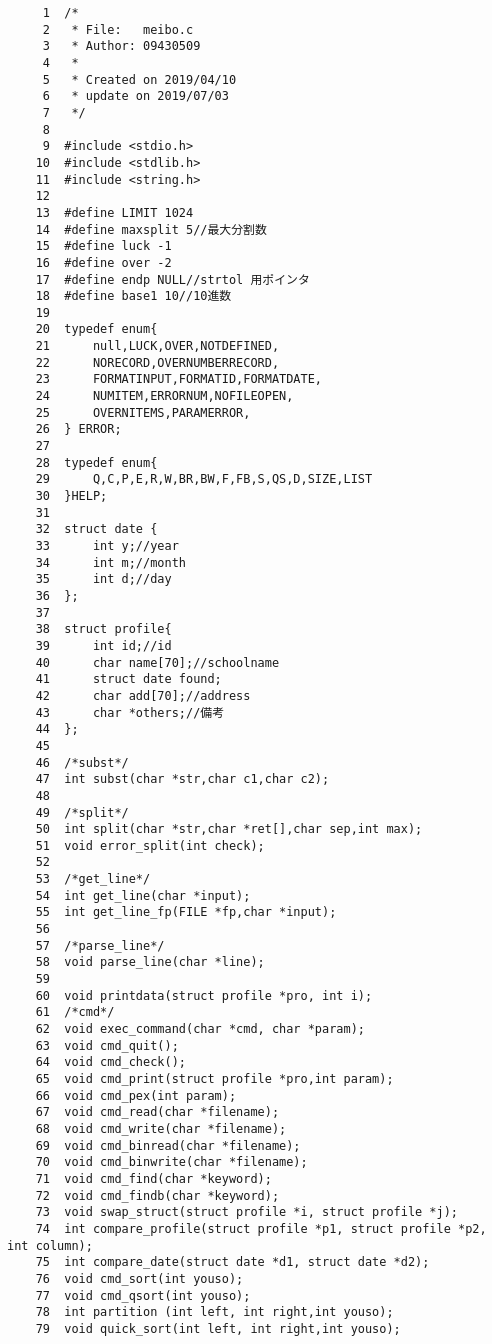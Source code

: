 \documentclass[a4j,11pt]{jarticle}
\begin{document}
%
%
{\fontsize{10pt}{11pt} \selectfont
\begin{verbatim}
     1	/* 
     2	 * File:   meibo.c
     3	 * Author: 09430509
     4	 *
     5	 * Created on 2019/04/10
     6	 * update on 2019/07/03
     7	 */
     8	
     9	#include <stdio.h>
    10	#include <stdlib.h>
    11	#include <string.h>
    12	
    13	#define LIMIT 1024
    14	#define maxsplit 5//最大分割数
    15	#define luck -1
    16	#define over -2
    17	#define endp NULL//strtol 用ポインタ
    18	#define base1 10//10進数
    19	
    20	typedef enum{
    21	    null,LUCK,OVER,NOTDEFINED,
    22	    NORECORD,OVERNUMBERRECORD,
    23	    FORMATINPUT,FORMATID,FORMATDATE,
    24	    NUMITEM,ERRORNUM,NOFILEOPEN,
    25	    OVERNITEMS,PARAMERROR,
    26	} ERROR;
    27	
    28	typedef enum{
    29	    Q,C,P,E,R,W,BR,BW,F,FB,S,QS,D,SIZE,LIST
    30	}HELP;
    31	
    32	struct date {
    33	    int y;//year
    34	    int m;//month
    35	    int d;//day
    36	};
    37	
    38	struct profile{
    39	    int id;//id
    40	    char name[70];//schoolname
    41	    struct date found;
    42	    char add[70];//address
    43	    char *others;//備考
    44	};
    45	
    46	/*subst*/
    47	int subst(char *str,char c1,char c2);
    48	
    49	/*split*/
    50	int split(char *str,char *ret[],char sep,int max);
    51	void error_split(int check);
    52	
    53	/*get_line*/
    54	int get_line(char *input);
    55	int get_line_fp(FILE *fp,char *input);
    56	
    57	/*parse_line*/
    58	void parse_line(char *line);
    59	
    60	void printdata(struct profile *pro, int i);
    61	/*cmd*/
    62	void exec_command(char *cmd, char *param);
    63	void cmd_quit();
    64	void cmd_check();
    65	void cmd_print(struct profile *pro,int param);
    66	void cmd_pex(int param);
    67	void cmd_read(char *filename);
    68	void cmd_write(char *filename);
    69	void cmd_binread(char *filename);
    70	void cmd_binwrite(char *filename);
    71	void cmd_find(char *keyword);
    72	void cmd_findb(char *keyword);
    73	void swap_struct(struct profile *i, struct profile *j);
    74	int compare_profile(struct profile *p1, struct profile *p2, int column);
    75	int compare_date(struct date *d1, struct date *d2);
    76	void cmd_sort(int youso);
    77	void cmd_qsort(int youso);
    78	int partition (int left, int right,int youso);
    79	void quick_sort(int left, int right,int youso);

\end{verbatim}}
\end{document}
